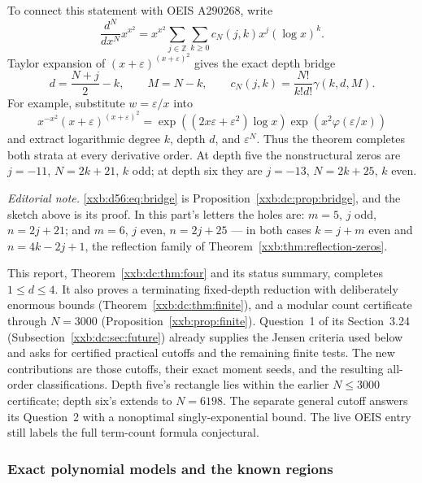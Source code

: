 \documentclass[11pt,a4paper]{article}
\numberwithin{equation}{section}
\theoremstyle{definition}
\theoremstyle{remark}
\theoremstyle{plain}
\newcommand{\Z}{\mathbb Z}
\begin{document}
To connect this statement with OEIS A290268, write
\[
 \frac{d^N}{dx^N}x^{x^2}
 =x^{x^2}\sum_{j\in\Z}\sum_{k\ge0}c_N(j,k)x^j(\log x)^k.
\]
Taylor expansion of $(x+\varepsilon)^{(x+\varepsilon)^2}$ gives the exact depth
bridge
\begin{equation}\label{xxb:d56:eq:bridge}
 d=\frac{N+j}{2}-k,\qquad M=N-k,\qquad
 c_N(j,k)=\frac{N!}{k!d!}\gamma(k,d,M).
\end{equation}
For example, substitute $w=\varepsilon/x$ into
\[
 x^{-x^2}(x+\varepsilon)^{(x+\varepsilon)^2}
 =\exp((2x\varepsilon+\varepsilon^2)\log x)\exp(x^2\varphi(\varepsilon/x))
\]
and extract logarithmic degree $k$, depth $d$, and $\varepsilon^N$.
Thus the theorem completes both strata at every derivative order. At depth five
the nonstructural zeros are $j=-11$, $N=2k+21$, $k$ odd; at depth six they are
$j=-13$, $N=2k+25$, $k$ even.

\emph{Editorial note.}  \eqref{xxb:d56:eq:bridge} is
Proposition~\ref{xxb:dc:prop:bridge}, and the sketch above is its proof.  In
this part's letters the holes are: $m=5$, $j$ odd, $n=2j+21$; and $m=6$, $j$
even, $n=2j+25$ --- in both cases $k=j+m$ even and $n=4k-2j+1$, the reflection
family of Theorem~\ref{xxb:thm:reflection-zeros}.

This report, Theorem~\ref{xxb:dc:thm:four} and its status summary, completes
$1\le d\le4$. It also proves a terminating fixed-depth reduction with
deliberately enormous bounds (Theorem~\ref{xxb:dc:thm:finite}), and a modular
count certificate through $N=3000$ (Proposition~\ref{xxb:prop:finite}).
Question~1 of its Section~3.24 (Subsection~\ref{xxb:dc:sec:future}) already
supplies the Jensen criteria used below and asks for certified practical
cutoffs and the remaining finite tests. The new contributions are those
cutoffs, their exact moment seeds, and the resulting all-order
classifications. Depth five's rectangle lies within the earlier $N\le3000$
certificate; depth six's extends to $N=6198$. The separate general cutoff
answers its Question~2 with a nonoptimal singly-exponential bound. The live
OEIS entry~\cite{oeis290268} still labels the full term-count formula
conjectural.

\subsubsection{Exact polynomial models and the known regions}
\end{document}
